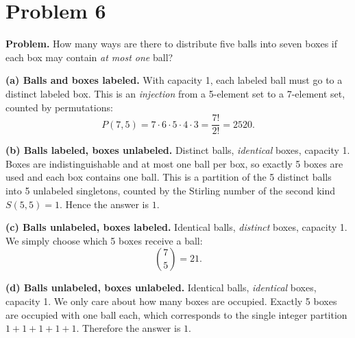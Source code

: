 \section*{Problem 6}
\textbf{Problem.} How many ways are there to distribute five balls into seven boxes if each box may contain \emph{at most one} ball?

\medskip
\textbf{(a) Balls and boxes labeled.}
With capacity 1, each labeled ball must go to a distinct labeled box. This is an \emph{injection}
from a 5-element set to a 7-element set, counted by permutations:
\[
P(7,5)=7\cdot 6\cdot 5\cdot 4\cdot 3=\frac{7!}{2!}=2520.
\]

\medskip
\textbf{(b) Balls labeled, boxes unlabeled.}
Distinct balls, \emph{identical} boxes, capacity 1. Boxes are indistinguishable and at most one ball per box,
so exactly 5 boxes are used and each box contains one ball. This is a partition of the 5 distinct balls
into 5 unlabeled singletons, counted by the Stirling number of the second kind \(S(5,5)=1\).
Hence the answer is \(\boxed{1}\).

\medskip
\textbf{(c) Balls unlabeled, boxes labeled.}
Identical balls, \emph{distinct} boxes, capacity 1. We simply choose which 5 boxes receive a ball:
\[
\binom{7}{5}=21.
\]

\medskip
\textbf{(d) Balls unlabeled, boxes unlabeled.}
Identical balls, \emph{identical} boxes, capacity 1. We only care about how many boxes are occupied.
Exactly 5 boxes are occupied with one ball each, which corresponds to the single integer partition
\(1+1+1+1+1\). Therefore the answer is \(\boxed{1}\).
